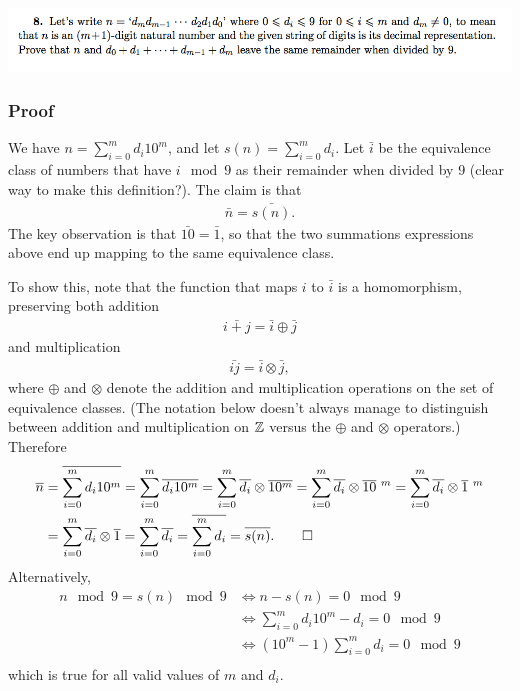 \documentclass[12pt]{article}
\begin{document}
\subsection*{}
\includegraphics[width=450pt]{img/iulm-2-8.png}
\begin{mdframed}
  \subsubsection*{Proof}
  We have $n = \sum_{i=0}^m d_i 10^m$, and let $s(n) = \sum_{i=0}^m d_i$. Let
  $\bar{i}$ be the equivalence class of numbers that have $i \mod 9$ as their
  remainder when divided by 9 (clear way to make this definition?). The claim
  is that
  \begin{align*}
  \bar n = \bar{s(n)}.
  \end{align*}
  The key observation is that $\bar {10} = \bar 1$, so that the two summations
  expressions above end up mapping to the same equivalence class.

  To show this, note that the function that maps $i$ to $\bar i$ is a
  homomorphism, preserving both addition
  \begin{align*}
  \bar{i + j} = \bar i \oplus \bar j
  \end{align*}
  and multiplication
  \begin{align*}
  \bar{ij} = \bar i \otimes \bar j,
  \end{align*}
  where $\oplus$ and $\otimes$ denote the addition and multiplication
  operations on the set of equivalence classes. (The notation below doesn't
  always manage to distinguish between addition and multiplication on $\Z$
  versus the $\oplus$ and $\otimes$ operators.) Therefore
  \begin{align*}
    \bar n &= \bar{\sum_{i=0}^m d_i 10^m}
           = \sum_{i=0}^m \bar{d_i 10^m}
           = \sum_{i=0}^m \bar{d_i} \otimes \bar{10^m}
           = \sum_{i=0}^m \bar{d_i} \otimes \bar{10}~^m
           = \sum_{i=0}^m \bar{d_i} \otimes \bar{1}~^m\\
           &= \sum_{i=0}^m \bar{d_i} \otimes \bar{1}
           = \sum_{i=0}^m \bar{d_i}
           = \bar{\sum_{i=0}^m d_i} = \bar{s(n)}. \qed\\
  \end{align*}
  Alternatively,
  \begin{align*}
    n \mod 9 = s(n) \mod 9
    &\iff n - s(n) = 0 \mod 9\\
    &\iff \sum_{i=0}^m d_i 10^m - d_i = 0 \mod 9\\
    &\iff (10^m - 1)\sum_{i=0}^m d_i = 0 \mod 9\\
  \end{align*}
  which is true for all valid values of $m$ and $d_i$.
\end{mdframed}
\end{document}
